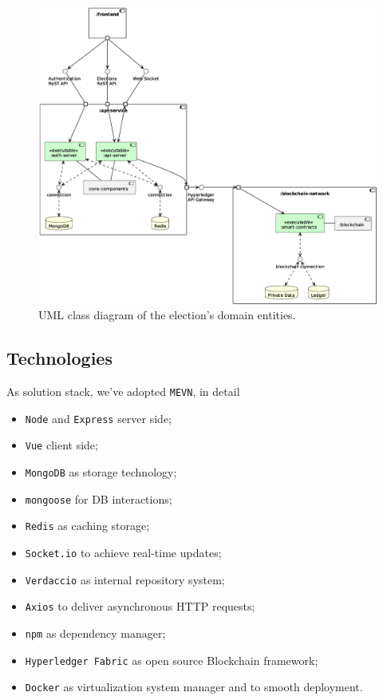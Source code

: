 \documentclass{scrartcl}
\begin{document}
\begin{landscape}
    \begin{figure}
        \centering
        \includegraphics[width=0.7\linewidth]{figures/system-architecture.eps}
        \caption{UML class diagram of the election's domain entities.}
        \label{fig:system-architecture} 
    \end{figure}
\end{landscape}
\restoregeometry

\subsection{Technologies}
\label{sec:technologies}

As solution stack, we've adopted \texttt{MEVN}, in detail
\begin{itemize}
    \item \texttt{Node} and \texttt{Express} server side;
    \item \texttt{Vue} client side;
    \item \texttt{MongoDB} as storage technology;
    \item \texttt{mongoose} for DB interactions;
    \item \texttt{Redis} as caching storage;
    \item \texttt{Socket.io} to achieve real-time updates;
    \item \texttt{Verdaccio} as internal repository system;
    \item \texttt{Axios} to deliver asynchronous HTTP requests;
    \item \texttt{npm} as dependency manager;
    \item \texttt{Hyperledger Fabric} as open source Blockchain framework;
    \item \texttt{Docker} as virtualization system manager and to smooth deployment.
\end{itemize}
\end{document}
